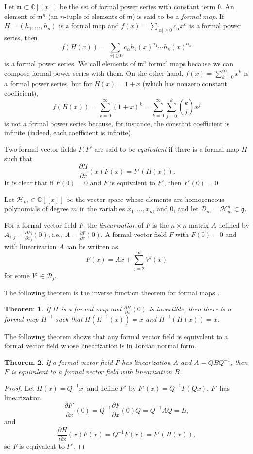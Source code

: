 \documentclass{article}
\newtheorem{theorem}{Theorem}
\begin{document}
Let $\mathfrak{m} \subset \mathbb{C}[[x]]$ be the set of formal power series with constant term $0$. 
An element of $\mathfrak{m}^n$ (an $n$-tuple of elements of $\mathfrak{m}$) is said to be a {\em formal map}. If $H=(h_1,\ldots,h_n)$ is a formal map and $f(x)=\sum_{|\alpha| \geq 0} c_\alpha x^\alpha$ is a formal power series, then
\[
f(H(x))=\sum_{|\alpha| \geq 0} c_\alpha h_1(x)^{\alpha_1} \cdots h_n(x)^{\alpha_n}
\] 
is a formal power series. We call elements of $\mathfrak{m}^n$ formal maps because we can compose
formal power series with them. On the other hand, $f(x)=\sum_{k=0}^\infty x^k$ is a formal power series, but 
for $H(x)=1+x$ (which has nonzero constant coefficient),
\[
f(H(x))=\sum_{k=0}^\infty (1+x)^k= \sum_{k=0}^\infty \sum_{j=0}^k \binom{k}{j} x^j
\]
is not a formal power series because, for instance, the constant coefficient is infinite (indeed, each coefficient is infinite).

Two formal vector fields $F,F'$ are said to be {\em equivalent} if there is a
formal map $H$ such that 
\[
\frac{\partial H}{\partial x}(x)F(x)=F'(H(x)).
\]
It is clear that if $F(0)=0$ and $F$ is equivalent to $F'$, then $F'(0)=0$.

Let $\mathscr{H}_m \subset \mathbb{C}[[x]]$ be the vector space whose elements are homogeneous polynomials of degree $m$ 
in the variables $x_1,\ldots,x_n$, and $0$, and let $\mathscr{D}_m=
\mathscr{H}_m^n \subset \mathfrak{g}$.

For a formal vector field $F$, the {\em linearization} of $F$ is the $n \times n$ matrix $A$ defined by $A_{i,j}=\frac{\partial F_i}{\partial x_j}(0)$, i.e., $A=\frac{\partial F}{\partial x}(0)$. A formal vector field
$F$ with $F(0)=0$ and with linearization $A$ can be written as 
\[
F(x)=Ax+\sum_{j=2}^\infty V^j(x)
\]
for some $V^j \in \mathscr{D}_j$.

The following theorem is the inverse function theorem for formal maps \cite[pp. 32--33]{analytic}.

\begin{theorem}
If $H$ is a formal map and $\frac{\partial H}{\partial x}(0)$ is invertible, then there is a formal map $H^{-1}$ such that $H(H^{-1}(x))=x$ and $H^{-1}(H(x))=x$.
\end{theorem}

The following theorem shows that any formal vector field is equivalent to a formal vector field whose linearization is in Jordan normal form.

\begin{theorem}
\label{jordanform}
If a formal vector field $F$ has linearization $A$ and $A=QBQ^{-1}$, then
$F$ is equivalent to a formal vector field with linearization $B$.
\end{theorem}
\begin{proof}
Let $H(x)=Q^{-1}x$, and
define $F'$ by $F'(x)=Q^{-1} F(Qx)$. $F'$ has linearization
\[
\frac{\partial F'}{\partial x}(0)=Q^{-1}\frac{\partial F}{\partial x}(0) Q=Q^{-1}AQ=B,
\]
and
\[
\frac{\partial H}{\partial x}(x)F(x)=Q^{-1}F(x)=F'(H(x)),
\]
so $F$ is equivalent to $F'$.
\end{proof}
\end{document}
